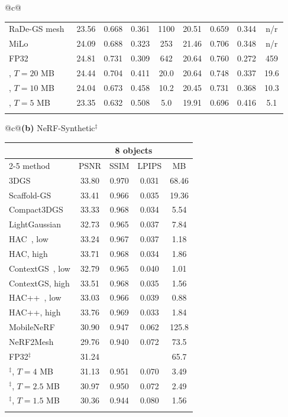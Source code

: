 \begin{table}[t]
\begin{tabular}[t]{@{}c@{}}
\begin{tabular}[t]{@{}lcccccccc@{}}
RaDe-GS mesh~\cite{rade2024} & 23.56 & 0.668 & 0.361 & 1100 & 20.51 & 0.659 & 0.344 & n/r \\
MiLo~\cite{milo2025} & 24.09 & 0.688 & 0.323 & 253 & 21.46 & 0.706 & 0.348 & n/r \\
\MS FP32~\cite{meshsplatting2025} & 24.81 & 0.731 & 0.309 & 642 & 20.64 & 0.760 & 0.272 & 459 \\
\midrule
\BM, $T{=}20$ MB & 24.44 & 0.704 & 0.411 & 20.0 & 20.64 & 0.748 & 0.337 & 19.6 \\
\BM, $T{=}10$ MB & 24.04 & 0.673 & 0.458 & 10.2 & 20.45 & 0.731 & 0.368 & 10.3 \\
\BM, $T{=}5$ MB & 23.35 & 0.632 & 0.508 & 5.0 & 19.91 & 0.696 & 0.416 & 5.1 \\
\\[-0.8em]\bottomrule
\end{tabular}
\end{tabular}\hfill
\begin{tabular}[t]{@{}c@{}}\textbf{(b)} NeRF-Synthetic$^\ddagger$\\[2pt]
\begin{tabular}[t]{@{}lcccc@{}}
\toprule
 & \multicolumn{4}{c}{8 objects} \\
\cmidrule(lr){2-5}
method & PSNR & SSIM & LPIPS & MB \\
\midrule
3DGS~\cite{kerbl2023gaussians} & 33.80 & 0.970 & 0.031 & 68.46 \\
Scaffold-GS~\cite{scaffold2024} & 33.41 & 0.966 & 0.035 & 19.36 \\
Compact3DGS~\cite{compact3dgs2024} & 33.33 & 0.968 & 0.034 & 5.54 \\
LightGaussian~\cite{lightgaussian2024} & 32.73 & 0.965 & 0.037 & 7.84 \\
HAC~\cite{hac2024}, low & 33.24 & 0.967 & 0.037 & 1.18 \\
HAC, high & 33.71 & 0.968 & 0.034 & 1.86 \\
ContextGS~\cite{contextgs2024}, low & 32.79 & 0.965 & 0.040 & 1.01 \\
ContextGS, high & 33.51 & 0.968 & 0.035 & 1.56 \\
HAC++~\cite{hacpp2025}, low & 33.03 & 0.966 & 0.039 & 0.88 \\
HAC++, high & 33.76 & 0.969 & 0.033 & 1.84 \\
\midrule
MobileNeRF~\cite{mobilenerf2023} & 30.90 & 0.947 & 0.062 & 125.8 \\
NeRF2Mesh~\cite{nerf2mesh2023} & 29.76 & 0.940 & 0.072 & 73.5 \\
\MS FP32$^\ddagger$ & 31.24 & \TODO{} & \TODO{} & 65.7 \\
\midrule
\BM$^\ddagger$, $T{=}4$ MB & 31.13 & 0.951 & 0.070 & 3.49 \\
\BM$^\ddagger$, $T{=}2.5$ MB & 30.97 & 0.950 & 0.072 & 2.49 \\
\BM$^\ddagger$, $T{=}1.5$ MB & 30.36 & 0.944 & 0.080 & 1.56 \\
\\[-0.8em]\bottomrule
\end{tabular}
\end{tabular}
\end{table}

